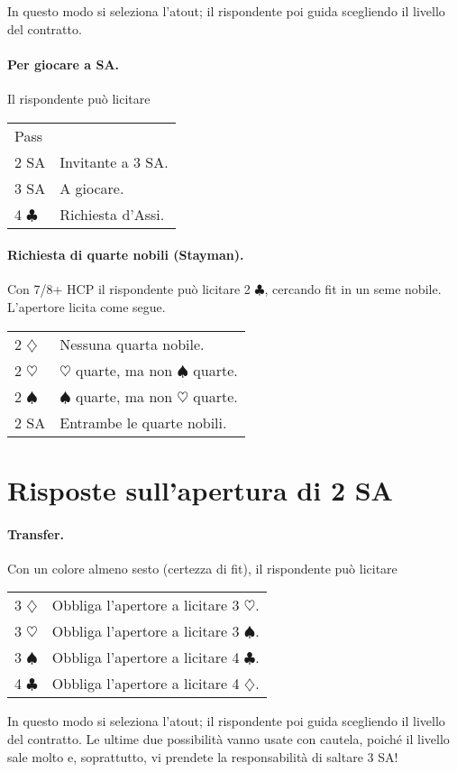 \documentclass[a4paper,10pt]{article}
\renewcommand{\c}{$\clubsuit$\xspace}
\renewcommand{\d}{$\diamondsuit$\xspace}
\newcommand{\h}{$\heartsuit$\xspace}
\newcommand{\s}{$\spadesuit$\xspace}
\newcommand{\sa}{SA\xspace}
\newcommand{\smallspace}{\vskip0.3cm}
\newenvironment{twocol}
  {\smallspace\noindent\begin{tabular}{l p{0.78\textwidth}}}
  {\end{tabular}\smallspace}
\begin{document}
In questo modo si seleziona l'atout; il rispondente poi guida scegliendo il livello del contratto.

\paragraph{Per giocare a \sa.} Il rispondente può licitare

\begin{twocol}
	Pass & \\
	2 \sa & Invitante a 3 \sa.\\
	3 \sa & A giocare.\\
	4 \c & Richiesta d'Assi.
\end{twocol}


\paragraph{Richiesta di quarte nobili (Stayman).} Con 7/8+ HCP il rispondente può licitare 2 \c, cercando fit in un seme nobile. L'apertore licita come segue.

\begin{twocol}
 2 \d & Nessuna quarta nobile.\\
 2 \h & \h quarte, ma non \s quarte.\\
 2 \s & \s quarte, ma non \h quarte.\\
 2 SA & Entrambe le quarte nobili.
\end{twocol}

\section{Risposte sull'apertura di 2 \sa}

\paragraph{Transfer.} Con un colore almeno sesto (certezza di fit), il rispondente può licitare

\begin{twocol}
 3 \d & Obbliga l'apertore a licitare 3 \h.\\
 3 \h & Obbliga l'apertore a licitare 3 \s.\\
 3 \s & Obbliga l'apertore a licitare 4 \c.\\
 4 \c & Obbliga l'apertore a licitare 4 \d.\\
\end{twocol}

In questo modo si seleziona l'atout; il rispondente poi guida scegliendo il livello del contratto. Le ultime due possibilità vanno usate con cautela, poiché il livello sale molto e, soprattutto, vi prendete la responsabilità di saltare 3 \sa!
\end{document}
